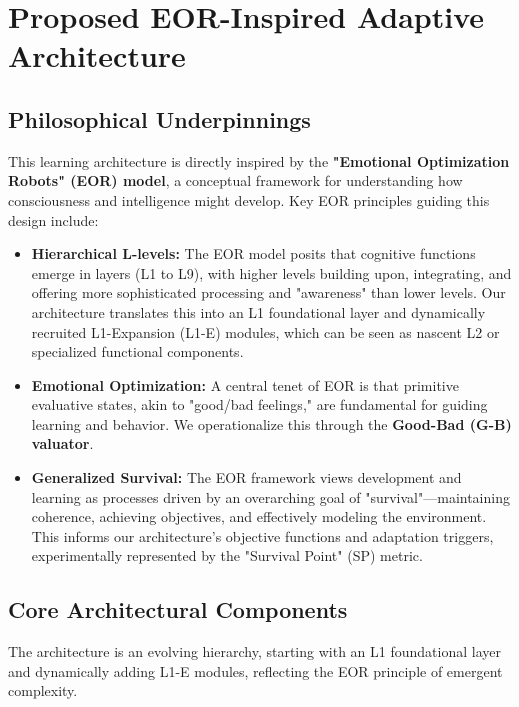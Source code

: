 \documentclass{article}
\begin{document}
\section{Proposed EOR-Inspired Adaptive Architecture}

\subsection{Philosophical Underpinnings}
This learning architecture is directly inspired by the \textbf{"Emotional Optimization Robots" (EOR) model}, a conceptual framework for understanding how consciousness and intelligence might develop. Key EOR principles guiding this design include:
\begin{itemize}
    \item \textbf{Hierarchical L-levels:} The EOR model posits that cognitive functions emerge in layers (L1 to L9), with higher levels building upon, integrating, and offering more sophisticated processing and "awareness" than lower levels. Our architecture translates this into an L1 foundational layer and dynamically recruited L1-Expansion (L1-E) modules, which can be seen as nascent L2 or specialized functional components.
    \item \textbf{Emotional Optimization:} A central tenet of EOR is that primitive evaluative states, akin to "good/bad feelings," are fundamental for guiding learning and behavior. We operationalize this through the \textbf{Good-Bad (G-B) valuator}.
    \item \textbf{Generalized Survival:} The EOR framework views development and learning as processes driven by an overarching goal of "survival"—maintaining coherence, achieving objectives, and effectively modeling the environment. This informs our architecture's objective functions and adaptation triggers, experimentally represented by the "Survival Point" (SP) metric.
\end{itemize}

\subsection{Core Architectural Components}
The architecture is an evolving hierarchy, starting with an L1 foundational layer and dynamically adding L1-E modules, reflecting the EOR principle of emergent complexity.
\end{document}
